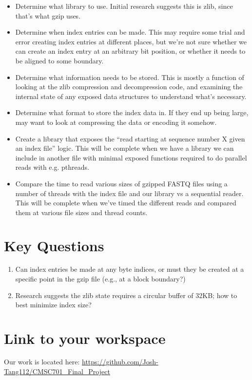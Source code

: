\documentclass[10pt]{article}
\begin{document}
\begin{itemize}

\item Determine what library to use. Initial research suggests this is zlib,
    since that's what gzip uses.
\item Determine when index entries can be made. This may require some trial and
    error creating index entries at different places, but we're not sure whether
        we can create an index entry at an arbitrary bit position, or whether it
        needs to be aligned to some boundary. 
\item Determine what information needs to be stored. This is mostly a function
    of looking at the zlib compression and decompression code, and examining the
    internal state of any exposed data structures to understand what's
        necessary. 
\item Determine what format to store the index data in. If they end up being
    large, may want to look at compressing the data or encoding it somehow.   
\item Create a library that exposes the ``read starting at sequence number
        X given an index file'' logic. This will be complete when we have a
        library we can include in another file with minimal exposed functions
        required to do parallel reads with e.g. pthreads.
\item Compare the time to read various sizes of gzipped FASTQ files using a
    number of threads with the index file and our library vs a sequential
        reader. This will be complete when we've timed the different reads and
        compared them at various file sizes and thread counts.
\end{itemize}

\section{Key Questions}

\begin{enumerate}
\item Can index entries be made at any  byte indices, or must they be created at
    a specific point in the gzip file (e.g., at a block boundary?)
\item Research suggests the zlib state requires a circular buffer of 32KB; how
    to best minimize index size?
\end{enumerate}

\section{Link to your workspace}

Our work is located here:
\url{https://github.com/Josh-Tang112/CMSC701_Final_Project}



\end{document}
